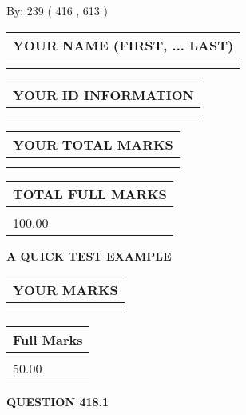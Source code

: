 \documentclass[12pt]{article}
\begin{document}
   
\hspace{1.0in} By: 
 239 ( 416 ,  613 )
   
   
   
   
\newpage 
\setcounter{page}{ 
   418001 } 
   
   
   
   
\noindent\begin{tabular}{|l|}
\hline
YOUR NAME (FIRST, ... LAST)  \\
\hline
 \\ 
 \\ 
\hline
\end{tabular}
\hspace{0.05in} \begin{tabular}{|l|}
\hline
 YOUR   ID   INFORMATION  \\
\hline
 \\ 
 \\ 
\hline
\end{tabular}
   
   
\vspace{0.2in}\noindent\begin{tabular}{|l|}
\hline
YOUR TOTAL MARKS  \\
\hline
 \\ 
 \\ 
\hline
\end{tabular}
\hspace{0.05in} \begin{tabular}{|l|}
\hline
TOTAL FULL MARKS  \\
\hline
 \\ 
100.00 \\
\hline
\end{tabular}
   
   
 \vspace{0.2in}
{\LARGE {\textbf{ A QUICK TEST EXAMPLE}}}
   
   
  
\vspace{0.2in}
  
\noindent\begin{tabular}{|l|}
\hline
 YOUR MARKS  \\
\hline
 \\ 
 \\ 
\hline
\end{tabular}
\hspace{0.05in} \begin{tabular}{|l|}
\hline
 Full Marks  \\
\hline
 \\ 
50.00 \\
\hline
\end{tabular}
{\textbf{\Large{QUESTION
418.1 
}}}
  
\end{document}
